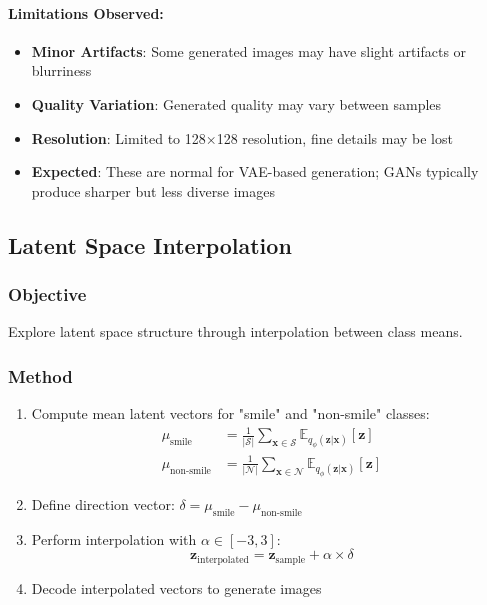 \documentclass[conference]{IEEEtran}
\begin{document}
\paragraph{Limitations Observed:}
\begin{itemize}
    \item \textbf{Minor Artifacts}: Some generated images may have slight artifacts or blurriness
    \item \textbf{Quality Variation}: Generated quality may vary between samples
    \item \textbf{Resolution}: Limited to 128×128 resolution, fine details may be lost
    \item \textbf{Expected}: These are normal for VAE-based generation; GANs typically produce sharper but less diverse images
\end{itemize}

\subsection{Latent Space Interpolation}

\subsubsection{Objective}
Explore latent space structure through interpolation between class means.

\subsubsection{Method}
\begin{enumerate}
    \item Compute mean latent vectors for "smile" and "non-smile" classes:
    \begin{align}
    \mu_{\text{smile}} &= \frac{1}{|\mathcal{S}|} \sum_{\mathbf{x} \in \mathcal{S}} \mathbb{E}_{q_\phi(\mathbf{z}|\mathbf{x})}[\mathbf{z}] \\
    \mu_{\text{non-smile}} &= \frac{1}{|\mathcal{N}|} \sum_{\mathbf{x} \in \mathcal{N}} \mathbb{E}_{q_\phi(\mathbf{z}|\mathbf{x})}[\mathbf{z}]
    \end{align}
    \item Define direction vector: $\delta = \mu_{\text{smile}} - \mu_{\text{non-smile}}$
    \item Perform interpolation with $\alpha \in [-3, 3]$:
    \begin{equation}
    \mathbf{z}_{\text{interpolated}} = \mathbf{z}_{\text{sample}} + \alpha \times \delta
    \end{equation}
    \item Decode interpolated vectors to generate images
\end{enumerate}
\end{document}

